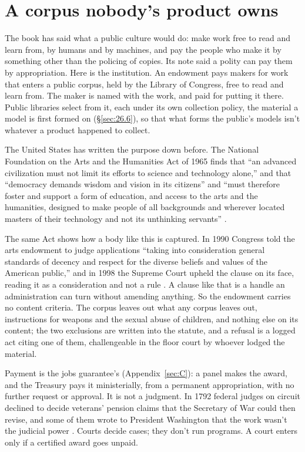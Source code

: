 \section{A corpus nobody's product owns}
\label{sec:28.5}
The book has said what a public culture would do: make work free to read and learn from, by humans and by machines, and pay the people who make it by something other than the policing of copies. Its note said a polity can pay them by appropriation. Here is the institution. An endowment pays makers for work that enters a public corpus, held by the Library of Congress, free to read and learn from. The maker is named with the work, and paid for putting it there. Public libraries select from it, each under its own collection policy, the material a model is first formed on (\S\ref{sec:26.6}), so that what forms the public's models isn't whatever a product happened to collect.

The United States has written the purpose down before. The National Foundation on the Arts and the Humanities Act of 1965 finds that “an advanced civilization must not limit its efforts to science and technology alone,” and that “democracy demands wisdom and vision in its citizens” and “must therefore foster and support a form of education, and access to the arts and the humanities, designed to make people of all backgrounds and wherever located masters of their technology and not its unthinking servants” \autocite{us1965artsact}.

The same Act shows how a body like this is captured. In 1990 Congress told the arts endowment to judge applications “taking into consideration general standards of decency and respect for the diverse beliefs and values of the American public,” and in 1998 the Supreme Court upheld the clause on its face, reading it as a consideration and not a rule \autocite{us1965artsact,scotus1998finley}. A clause like that is a handle an administration can turn without amending anything. So the endowment carries no content criteria. The corpus leaves out what any corpus leaves out, instructions for weapons and the sexual abuse of children, and nothing else on its content; the two exclusions are written into the statute, and a refusal is a logged act citing one of them, challengeable in the floor court by whoever lodged the material.

Payment is the jobs guarantee's (Appendix~\ref{sec:C}): a panel makes the award, and the Treasury pays it ministerially, from a permanent appropriation, with no further request or approval. It is not a judgment. In 1792 federal judges on circuit declined to decide veterans' pension claims that the Secretary of War could then revise, and some of them wrote to President Washington that the work wasn't the judicial power \autocite{fjc1792hayburn}. Courts decide cases; they don't run programs. A court enters only if a certified award goes unpaid.

